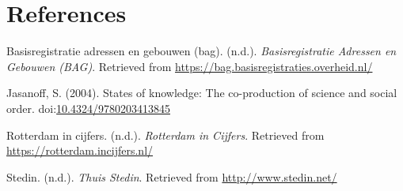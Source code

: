 \documentclass[english,man,doc,11pt, twoside,floatsintext]{apa6}
\begin{document}
\newpage

\section{References}\label{references}

\begingroup
\setlength{\parindent}{-0.5in} \setlength{\leftskip}{0.5in}

\hypertarget{refs}{}
\hypertarget{ref-BAG}{}
Basisregistratie adressen en gebouwen (bag). (n.d.).
\emph{Basisregistratie Adressen en Gebouwen (BAG)}. Retrieved from
\url{https://bag.basisregistraties.overheid.nl/}

\hypertarget{ref-jasanoff_2004}{}
Jasanoff, S. (2004). States of knowledge: The co-production of science
and social order.
doi:\href{https://doi.org/10.4324/9780203413845}{10.4324/9780203413845}

\hypertarget{ref-rotterdam_in_cijfers}{}
Rotterdam in cijfers. (n.d.). \emph{Rotterdam in Cijfers}. Retrieved
from \url{https://rotterdam.incijfers.nl/}

\hypertarget{ref-stedin}{}
Stedin. (n.d.). \emph{Thuis \textbar{} Stedin}. Retrieved from
\url{http://www.stedin.net/}

\endgroup
\end{document}
